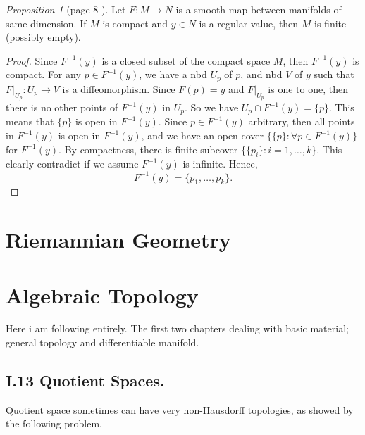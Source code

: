 \documentclass[a4paper]{article}
\theoremstyle{remark}
\newtheorem{prop}{Proposition}
\begin{document}
\begin{prop}[page 8 \cite{MilnorDT}]
Let $F : M \to N$ is a smooth map between manifolds of same dimension. If $M$ is compact and $y \in N$ is a regular value, then $M$ is finite (possibly empty).
\end{prop}
\begin{proof}
Since $F^{-1}(y)$ is a closed subset of the compact space $M$, then $F^{-1}(y)$ is compact. For any $p \in F^{-1}(y)$, we have a nbd $U_p$ of $p$, and nbd $V$ of $y$ such that $F|_{U_p} : U_p \to V$ is a diffeomorphism. Since $F(p)=y$ and $F|_{U_p}$ is one to one, then there is no other points of $F^{-1}(y)$ in $U_p$. So we have $U_p \cap F^{-1}(y) = \{p\}$. This means that $\{p\}$ is open in $F^{-1}(y)$. Since $p \in F^{-1}(y)$ arbitrary, then all points in $F^{-1}(y)$ is open in $F^{-1}(y)$, and  we have an open cover $\{\{p\} : \forall p \in F^{-1}(y) \}$  for $F^{-1}(y)$. By compactness, there is finite subcover $\{\{p_i\} : i=1,\dots,k \}$. This clearly contradict if we assume $F^{-1}(y)$ is infinite. Hence,
$$
F^{-1}(y) = \{p_1,\dots,p_k\}.
$$
\end{proof}
\section{Riemannian Geometry}


\section{Algebraic Topology}
Here i am following \cite{bredon} entirely. The first two chapters dealing with basic material; general topology and differentiable manifold.

\subsection*{I.13 Quotient Spaces.} 
Quotient space sometimes can have very non-Hausdorff topologies, as showed by the following problem.
\end{document}
